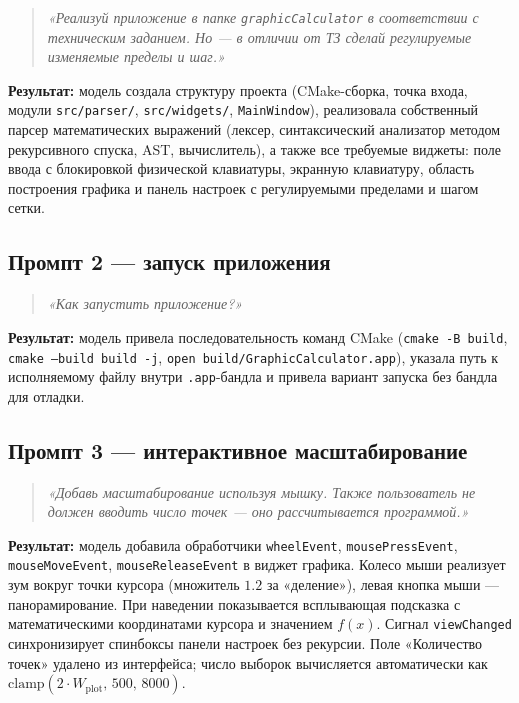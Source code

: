 \documentclass[a4paper, final]{article}
\begin{document}
\begin{quote}
\itshape
«Реализуй приложение в папке \texttt{graphicCalculator} в соответствии
с техническим заданием. Но --- в отличии от ТЗ сделай регулируемые
изменяемые пределы и шаг.»
\end{quote}

\textbf{Результат:} модель создала структуру проекта (CMake-сборка,
точка входа, модули \texttt{src/parser/}, \texttt{src/widgets/},
\texttt{MainWindow}), реализовала собственный парсер математических
выражений (лексер, синтаксический анализатор методом рекурсивного
спуска, AST, вычислитель), а также все требуемые виджеты: поле ввода
с блокировкой физической клавиатуры, экранную клавиатуру,
область построения графика и панель настроек с регулируемыми пределами
и шагом сетки.

\subsection{Промпт 2 --- запуск приложения}

\begin{quote}
\itshape
«Как запустить приложение?»
\end{quote}

\textbf{Результат:} модель привела последовательность команд CMake
(\texttt{cmake -B build}, \texttt{cmake --build build -j},
\texttt{open build/GraphicCalculator.app}), указала путь к исполняемому
файлу внутри \texttt{.app}-бандла и привела вариант запуска
без бандла для отладки.

\subsection{Промпт 3 --- интерактивное масштабирование}

\begin{quote}
\itshape
«Добавь масштабирование используя мышку. Также пользователь не должен
вводить число точек --- оно рассчитывается программой.»
\end{quote}

\textbf{Результат:} модель добавила обработчики \texttt{wheelEvent},
\texttt{mousePressEvent}, \texttt{mouseMoveEvent},
\texttt{mouseReleaseEvent} в виджет графика. Колесо мыши реализует
зум вокруг точки курсора (множитель $1.2$ за «деление»),
левая кнопка мыши --- панорамирование. При наведении показывается
всплывающая подсказка с математическими координатами курсора
и значением $f(x)$. Сигнал \texttt{viewChanged} синхронизирует
спинбоксы панели настроек без рекурсии. Поле «Количество точек»
удалено из интерфейса; число выборок вычисляется автоматически
как $\mathrm{clamp}(2 \cdot W_{\text{plot}},\, 500,\, 8000)$.
\end{document}
